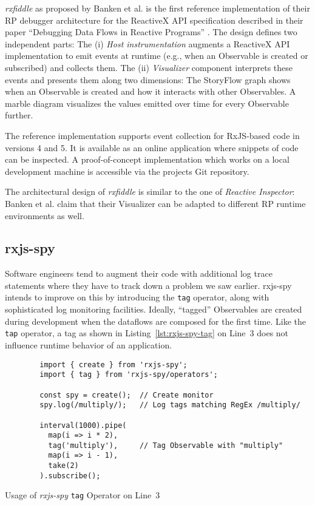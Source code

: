 \documentclass[12pt,a4paper]{article}
\begin{document}
\emph{rxfiddle} as proposed by Banken et al. is the first reference implementation of their RP debugger architecture for the ReactiveX API specification described in their paper ``Debugging Data Flows in Reactive Programs'' \cite{10.1145/3180155.3180156}. The design defines two independent parts: The (i) \emph{Host instrumentation} augments a ReactiveX API implementation to emit events at runtime (e.g., when an Observable is created or subscribed) and collects them. The (ii) \emph{Visualizer} component interprets these events and presents them along two dimensions: The StoryFlow graph \cite{YWu2013a} shows when an Observable is created and how it interacts with other Observables. A marble diagram visualizes the values emitted over time for every Observable further.

The reference implementation supports event collection for RxJS-based code in versions 4 and 5. It is available as an online application where snippets of code can be inspected. A proof-of-concept implementation which works on a local development machine is accessible via the projects Git repository.

The architectural design of \emph{rxfiddle} is similar to the one of \emph{Reactive Inspector}: Banken et al. claim that their Visualizer can be adapted to different RP runtime environments as well.

\subsection{rxjs-spy}

Software engineers tend to augment their code with additional log trace statements where they have to track down a problem we saw earlier. rxjs-spy\cite{rxjsspy} intends to improve on this by introducing the \texttt{tag} operator, along with sophisticated log monitoring facilities. Ideally, ``tagged'' Observables are created during development when the dataflows are composed for the first time. Like the \texttt{tap} operator, a tag as shown in Listing~\ref{lst:rxjs-spy-tag} on Line~3 does not influence runtime behavior of an application.

\begin{listing}[H]
	\begin{verbatim}
		import { create } from 'rxjs-spy';
		import { tag } from 'rxjs-spy/operators';

		const spy = create();  // Create monitor
		spy.log(/multiply/);   // Log tags matching RegEx /multiply/

		interval(1000).pipe(
		  map(i => i * 2),
		  tag('multiply'),     // Tag Observable with "multiply"
		  map(i => i - 1),
		  take(2)
		).subscribe();
	\end{verbatim}
	\caption{Usage of \emph{rxjs-spy} \texttt{tag} Operator on Line~3}
	\label{lst:rxjs-spy-tag}
\end{listing}
\end{document}
